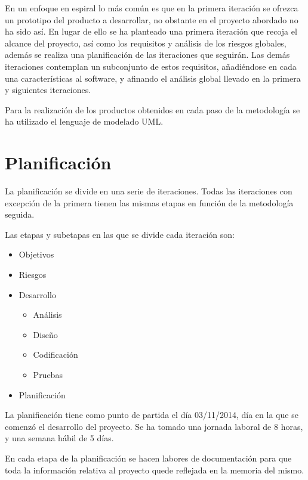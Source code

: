 En un enfoque en espiral lo más común es que en la primera iteración se ofrezca un prototipo del producto a desarrollar, 
no obstante en el proyecto abordado no ha sido así. En lugar de ello se ha planteado una primera iteración que recoja el alcance 
del proyecto, así como los requisitos y análisis de los riesgos globales, además se realiza una planificación de las iteraciones que seguirán. 
Las demás iteraciones contemplan un subconjunto de estos requisitos, añadiéndose en cada una características al software, y afinando el 
análisis global llevado en la primera y siguientes iteraciones.

Para la realización de los productos obtenidos en cada paso de la metodología se ha utilizado el lenguaje de modelado UML. 
\section{Planificación}

La planificación se divide en una serie de iteraciones. Todas las 
iteraciones con excepción de la primera tienen las mismas etapas
en función de la metodología seguida.

Las etapas y subetapas en las que se divide cada iteración son:

\begin {itemize}
\item Objetivos
\item Riesgos
\item Desarrollo
\begin{itemize}
\item Análisis
\item Diseño
\item Codificación
\item Pruebas
\end{itemize}
\item Planificación
\end {itemize}

La planificación tiene como punto de partida el día 03/11/2014, día en la que se 
comenzó el desarrollo del proyecto. Se ha tomado una jornada laboral de 8 horas, 
y una semana hábil de 5 días.

En cada etapa de la planificación se hacen labores de documentación para que
toda la información relativa al proyecto quede reflejada en la memoria 
del mismo. 



